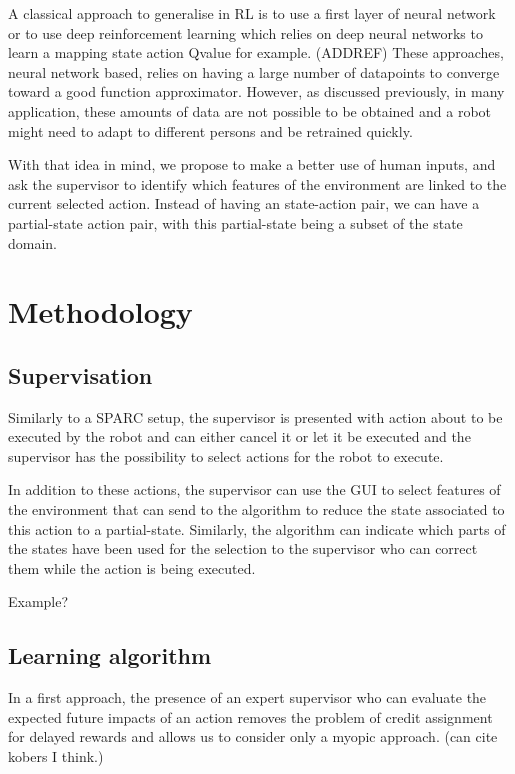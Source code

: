 \documentclass[letterpaper]{article} %
\begin{document}
A classical approach to generalise in RL is to use a first layer of neural
network or to use deep reinforcement learning which relies on deep neural
networks to learn a mapping state action Qvalue for example. (ADDREF)
These approaches, neural network based, relies on having a large number of
datapoints to converge toward a good function approximator. However, as
discussed previously, in many application, these amounts of data are not
possible to be obtained and a robot might need to adapt to different persons and
be retrained quickly.

With that idea in mind, we propose to make a better use of human inputs, and ask
the supervisor to identify which features of the environment are linked to the
current selected action. Instead of having an state-action pair, we
can have a partial-state action pair, with this partial-state being a subset of
the state domain.

\section{Methodology}

\subsection{Supervisation}
Similarly to a SPARC setup, the supervisor is presented with action about to be
executed by the robot and can either cancel it or let it be executed and the 
supervisor has the possibility to select actions for the robot to execute.

In addition to these actions, the supervisor can use the GUI to select features
of the environment that can send to the algorithm to reduce the state associated
to this action to a partial-state. Similarly, the algorithm can indicate which
parts of the states have been used for the selection to the supervisor who can
correct them while the action is being executed.

Example?

\subsection{Learning algorithm}

In a first approach, the presence of an expert supervisor who can evaluate the
expected future impacts of an action removes the problem of credit assignment
for delayed rewards and allows us to consider only a myopic approach. (can cite
kobers I think.)
\end{document}
